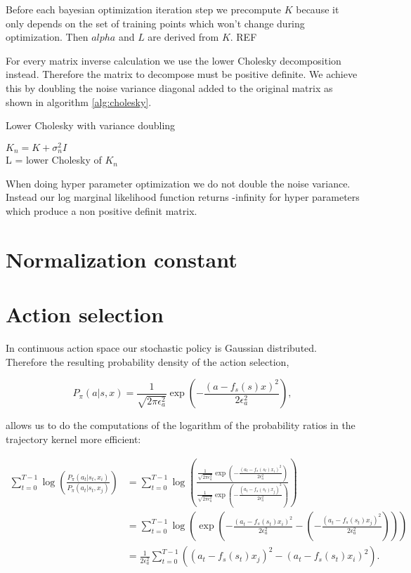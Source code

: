 Before each bayesian optimization iteration step we precompute $K$ because it only depends on the set of training points which won't change during optimization. Then $alpha$ and $L$ are derived from $K$. REF

For every matrix inverse calculation we use the lower Cholesky decomposition instead. Therefore the matrix to decompose must be positive definite. We achieve this by doubling the noise variance diagonal added to the original matrix as shown in algorithm \ref{alg:cholesky}.

\begin{algorithm}
    \caption{Lower Cholesky with variance doubling\label{alg:cholesky}}
    \BlankLine
    $K_n = K+\sigma_n^2 I$\\
    L = lower Cholesky of $K_n$\\
\end{algorithm}

When doing hyper parameter optimization we do not double the noise variance. Instead our log marginal likelihood function returns -infinity for hyper parameters which produce a non positive definit matrix.

\section{Normalization constant}

\section{Action selection}

In continuous action space our stochastic policy is Gaussian distributed. Therefore the resulting probability density of the action selection,

$$P_{\pi}(a|s,x) = \frac{1}{\sqrt{2\pi\epsilon_a^2}}\exp\left(-\frac{(a-f_s(s)x)^2}{2\epsilon_a^2}\right),$$

allows us to do the computations of the logarithm of the probability ratios in the trajectory kernel more efficient:

\begin{align*}
    \sum_{t=0}^{T-1} \log \left(\frac{P_{\pi}(a_{t}|s_{t},x_i)}{P_{\pi}(a_{t}|s_{t},x_j)}\right) &= \sum_{t=0}^{T-1} \log \left(\frac{\frac{1}{\sqrt{2\pi\epsilon_a^2}}\exp\left(-\frac{(a_t-f_s(s_t)x_i)^2}{2\epsilon_a^2}\right)}{\frac{1}{\sqrt{2\pi\epsilon_a^2}}\exp\left(-\frac{(a_t-f_s(s_t)x_j)^2}{2\epsilon_a^2}\right)}\right)\\
    &= \sum_{t=0}^{T-1} \log \left( \exp \left( -\frac{(a_t-f_s(s_t)x_i)^2}{2\epsilon_a^2} - \left(-\frac{(a_t-f_s(s_t)x_j)^2}{2\epsilon_a^2}\right)\right)\right)\\
    &= \frac{1}{2\epsilon_a^2} \sum_{t=0}^{T-1} \left((a_t-f_s(s_t)x_j)^2 - (a_t-f_s(s_t)x_i)^2\right).
\end{align*}




